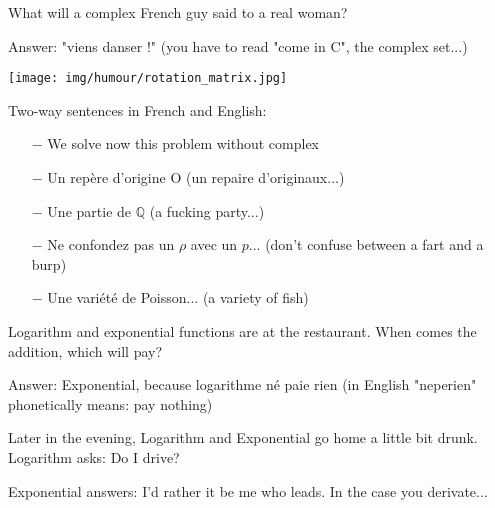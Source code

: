 	\begin{center}\underline{\hspace{5 cm}}\end{center}
	 
What will a complex French guy said to a real woman?

Answer: "viens danser !" (you have to read "come in C", the complex set...)

	\begin{center}\underline{\hspace{5 cm}}\end{center}
	
	\begin{center}
		\texttt{[image: img/humour/rotation\_matrix.jpg]}	
	\end{center}
	
	\begin{center}\underline{\hspace{5 cm}}\end{center}

Two-way sentences in French and English:

\begin{itemize}	 
	\item[$-$] We solve now this problem without complex

	\item[$-$] Un repère d'origine O (un repaire d'originaux...) 

	\item[$-$] Une partie de $\mathbb{Q}$ (a fucking party...)

	\item[$-$] Ne confondez pas un $\rho$ avec un $p$... (don't confuse between a fart and a burp)

	\item[$-$] Une variété de Poisson... (a variety of fish)
\end{itemize}
	\begin{center}\underline{\hspace{5 cm}}\end{center}

Logarithm and exponential functions are at the restaurant. When comes the addition, which will pay?

Answer: Exponential, because logarithme né paie rien (in English "neperien" phonetically means: pay nothing)

Later in the evening, Logarithm and Exponential go home a little bit drunk. Logarithm asks: Do I drive?

Exponential answers: I'd rather it be me who leads. In the case you derivate...
	\begin{center}\underline{\hspace{5 cm}}\end{center}

